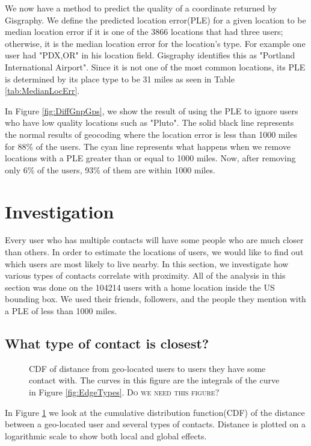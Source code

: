 \documentclass{sig-alternate}
\begin{document}
We now have a method to predict the quality of a coordinate returned by Gisgraphy.
We define the predicted location error(PLE) for a given location to be median location error if it is one of the 3866 locations that had three users; otherwise, it is the median location error for the location's type.
For example one user had "PDX,OR" in his location field. Gisgraphy identifies this as "Portland International Airport". Since it is not one of the most common locations, its PLE is determined by its place type to be 31 miles as seen in Table \ref{tab:MedianLocErr}.

In Figure \ref{fig:DiffGnpGps}, we show the result of using the PLE to ignore users who have low quality locations such as "Pluto".
The solid black line represents the normal results of geocoding where the location error is less than 1000 miles for 88\% of the users.
The cyan line represents what happens when we remove locations with a PLE greater than or equal to 1000 miles. Now, after removing only 6\% of the users, 93\% of them are within 1000 miles.

\section{Investigation}
Every user who has multiple contacts will have some people who are much
closer than others. In order to estimate the locations of users, we would like
to find out which users are most likely to live nearby.  In this section, we
investigate how various types of contacts correlate with proximity.
All of the analysis in this section was done on the 104214 users with a home
location inside the US bounding box. We used their friends, followers, and the
people they mention with a PLE of less than 1000 miles.

\subsection{What type of contact is closest?}
\begin{figure}
\centering
{}
\caption{
CDF of distance from geo-located users to users they have some contact
with.
The curves in this figure are the integrals of the curve in Figure \ref{fig:EdgeTypes}.
\textsc{Do we need this figure?}
}
\label{fig:EdgeTypesCum}
\end{figure}
In Figure \ref{fig:EdgeTypesCum} we look at the cumulative distribution
function(CDF) of the distance between a geo-located user and several types of
contacts.
Distance is plotted on a logarithmic scale to show both local and
global effects.
\end{document}

